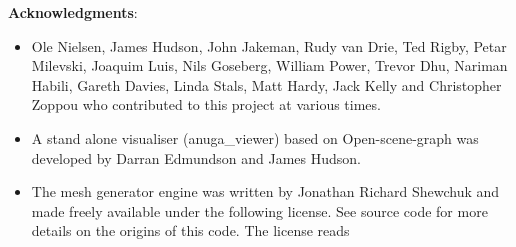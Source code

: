 \pagebreak
\textbf{Acknowledgments}:
\begin{itemize}
\item Ole Nielsen, James Hudson, John Jakeman, Rudy van Drie, Ted Rigby,
      Petar Milevski, Joaquim Luis, Nils Goseberg, William Power,
      Trevor Dhu, Nariman Habili, Gareth Davies, Linda Stals, Matt Hardy, Jack Kelly and Christopher
      Zoppou who contributed to this project at various times.
\item A stand alone visualiser (anuga\_viewer) based on Open-scene-graph was developed by Darran Edmundson and James Hudson.
\item The mesh generator engine was written by Jonathan Richard Shewchuk and made freely
      available under the following license.  See source code  for more
      details on the origins of this code. The license reads


\end{itemize}
